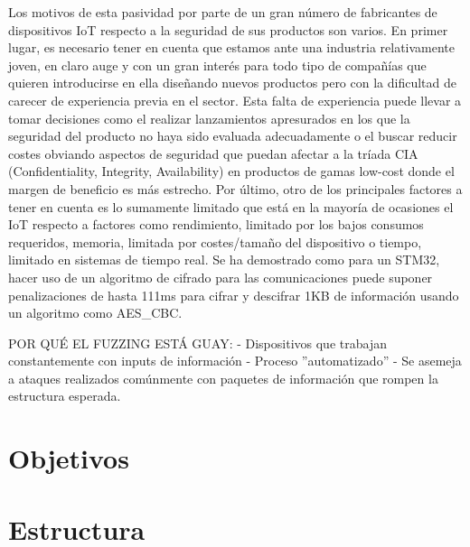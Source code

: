 Los motivos de esta pasividad por parte de un gran número de fabricantes de dispositivos IoT respecto a la 
seguridad de sus productos son varios. En primer lugar, es necesario tener en cuenta que estamos ante una industria relativamente 
joven, en claro auge y con un gran interés para todo tipo de compañías que quieren introducirse en ella diseñando 
nuevos productos pero con la dificultad de carecer de experiencia previa en el sector. Esta falta de experiencia puede
llevar a tomar decisiones como el realizar lanzamientos apresurados en los que la seguridad del producto no haya 
sido evaluada adecuadamente o el buscar reducir costes obviando aspectos de seguridad que puedan afectar a 
la tríada CIA (Confidentiality, Integrity, Availability) en productos de gamas low-cost donde el margen de beneficio 
es más estrecho. Por último, otro de los principales factores a tener en cuenta es lo sumamente limitado que 
está en la mayoría de ocasiones el IoT respecto a factores como rendimiento, limitado por los bajos consumos 
requeridos, memoria, limitada por costes/tamaño del dispositivo o tiempo, limitado en sistemas de tiempo real. 
Se ha demostrado como para un STM32, hacer uso de un algoritmo de cifrado para las comunicaciones puede suponer 
penalizaciones de hasta 111ms\cite{performance} para cifrar y descifrar 1KB de información usando un algoritmo como AES\_CBC.


POR QUÉ EL FUZZING ESTÁ GUAY:
- Dispositivos que trabajan constantemente con inputs de información
- Proceso ''automatizado''
- Se asemeja a ataques realizados comúnmente con paquetes de información que rompen la estructura esperada.

\section{Objetivos}
\section{Estructura}
